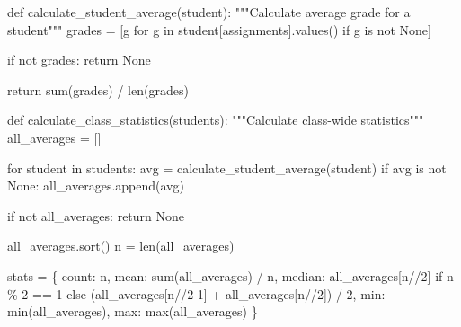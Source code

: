 \documentclass[
  letterpaper,
  DIV=11,
  numbers=noendperiod,
  oneside]{scrreprt}
\newenvironment{Shaded}{}{}
\newcommand{\BuiltInTok}[1]{\textcolor[rgb]{0.84,0.23,0.29}{#1}}
\newcommand{\CommentTok}[1]{\textcolor[rgb]{0.42,0.45,0.49}{#1}}
\newcommand{\ControlFlowTok}[1]{\textcolor[rgb]{0.84,0.23,0.29}{#1}}
\newcommand{\DecValTok}[1]{\textcolor[rgb]{0.00,0.36,0.77}{#1}}
\newcommand{\KeywordTok}[1]{\textcolor[rgb]{0.84,0.23,0.29}{#1}}
\newcommand{\NormalTok}[1]{\textcolor[rgb]{0.14,0.16,0.18}{#1}}
\newcommand{\OperatorTok}[1]{\textcolor[rgb]{0.14,0.16,0.18}{#1}}
\newcommand{\StringTok}[1]{\textcolor[rgb]{0.01,0.18,0.38}{#1}}
\newcommand{\VariableTok}[1]{\textcolor[rgb]{0.89,0.38,0.04}{#1}}
\begin{document}
\begin{Shaded}
\begin{Highlighting}[]
\KeywordTok{def}\NormalTok{ calculate\_student\_average(student):}
    \CommentTok{"""Calculate average grade for a student"""}
\NormalTok{    grades }\OperatorTok{=}\NormalTok{ [g }\ControlFlowTok{for}\NormalTok{ g }\KeywordTok{in}\NormalTok{ student[}\StringTok{\textquotesingle{}assignments\textquotesingle{}}\NormalTok{].values() }\ControlFlowTok{if}\NormalTok{ g }\KeywordTok{is} \KeywordTok{not} \VariableTok{None}\NormalTok{]}
    
    \ControlFlowTok{if} \KeywordTok{not}\NormalTok{ grades:}
        \ControlFlowTok{return} \VariableTok{None}
    
    \ControlFlowTok{return} \BuiltInTok{sum}\NormalTok{(grades) }\OperatorTok{/} \BuiltInTok{len}\NormalTok{(grades)}

\KeywordTok{def}\NormalTok{ calculate\_class\_statistics(students):}
    \CommentTok{"""Calculate class{-}wide statistics"""}
\NormalTok{    all\_averages }\OperatorTok{=}\NormalTok{ []}
    
    \ControlFlowTok{for}\NormalTok{ student }\KeywordTok{in}\NormalTok{ students:}
\NormalTok{        avg }\OperatorTok{=}\NormalTok{ calculate\_student\_average(student)}
        \ControlFlowTok{if}\NormalTok{ avg }\KeywordTok{is} \KeywordTok{not} \VariableTok{None}\NormalTok{:}
\NormalTok{            all\_averages.append(avg)}
    
    \ControlFlowTok{if} \KeywordTok{not}\NormalTok{ all\_averages:}
        \ControlFlowTok{return} \VariableTok{None}
    
\NormalTok{    all\_averages.sort()}
\NormalTok{    n }\OperatorTok{=} \BuiltInTok{len}\NormalTok{(all\_averages)}
    
\NormalTok{    stats }\OperatorTok{=}\NormalTok{ \{}
        \StringTok{\textquotesingle{}count\textquotesingle{}}\NormalTok{: n,}
        \StringTok{\textquotesingle{}mean\textquotesingle{}}\NormalTok{: }\BuiltInTok{sum}\NormalTok{(all\_averages) }\OperatorTok{/}\NormalTok{ n,}
        \StringTok{\textquotesingle{}median\textquotesingle{}}\NormalTok{: all\_averages[n}\OperatorTok{//}\DecValTok{2}\NormalTok{] }\ControlFlowTok{if}\NormalTok{ n }\OperatorTok{\%} \DecValTok{2} \OperatorTok{==} \DecValTok{1} \ControlFlowTok{else} 
\NormalTok{                 (all\_averages[n}\OperatorTok{//}\DecValTok{2}\OperatorTok{{-}}\DecValTok{1}\NormalTok{] }\OperatorTok{+}\NormalTok{ all\_averages[n}\OperatorTok{//}\DecValTok{2}\NormalTok{]) }\OperatorTok{/} \DecValTok{2}\NormalTok{,}
        \StringTok{\textquotesingle{}min\textquotesingle{}}\NormalTok{: }\BuiltInTok{min}\NormalTok{(all\_averages),}
        \StringTok{\textquotesingle{}max\textquotesingle{}}\NormalTok{: }\BuiltInTok{max}\NormalTok{(all\_averages)}
\NormalTok{    \}}
    

\end{Highlighting}
\end{Shaded}
\end{document}
